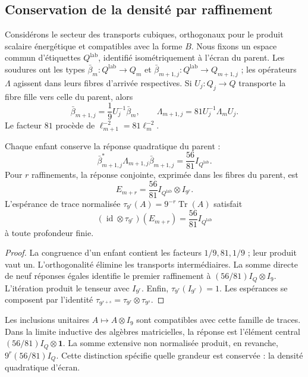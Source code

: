 \subsection{Conservation de la densité par raffinement}
\label{vii:vii:sec:densidad-refinamiento}

Considérons le secteur des transports cubiques, orthogonaux pour le produit scalaire énergétique et compatibles avec la forme \(B\). Nous fixons un espace commun d'étiquettes \(Q^{\mathrm{lab}}\), identifié isométriquement à l'écran du parent. Les soudures ont les types \(\bar\beta_m:Q^{\mathrm{lab}}\longrightarrow Q_m\) et \(\bar\beta_{m+1,j}:Q^{\mathrm{lab}}\longrightarrow Q_{m+1,j}\) ; les opérateurs \(\Lambda\) agissent dans leurs fibres d'arrivée respectives. Si \(U_j:Q_j\longrightarrow Q\) transporte la fibre fille vers celle du parent, alors
\[
 \bar\beta_{m+1,j}=\frac19U_j^{-1}\bar\beta_m,\qquad
 \Lambda_{m+1,j}=81U_j^{-1}\Lambda_mU_j.
\]
Le facteur \(81\) procède de \(\ell_{m+1}^{-2}=81\ell_m^{-2}\).

\begin{theorem}
\label{vii:vii:thm:densidad}
Chaque enfant conserve la réponse quadratique du parent :
\[
 \bar\beta_{m+1,j}^*\Lambda_{m+1,j}\bar\beta_{m+1,j}
 =\frac{56}{81}I_{Q^{\mathrm{lab}}}.
\]
Pour \(r\) raffinements, la réponse conjointe, exprimée dans les fibres
du parent, est
\[
 E_{m+r}=\frac{56}{81}I_{Q^{\mathrm{lab}}}\otimes I_{9^r}.
\]
L'espérance de trace normalisée
\(\tau_{9^r}(A)=9^{-r}\operatorname{Tr}(A)\) satisfait
\[
 (\operatorname{id}\otimes\tau_{9^r})(E_{m+r})
 =\frac{56}{81}I_{Q^{\mathrm{lab}}}
\]
à toute profondeur finie.
\end{theorem}

\begin{proof}
La congruence d'un enfant contient les facteurs \(1/9,81,1/9\) ;
leur produit vaut un. L'orthogonalité élimine les transports
intermédiaires. La somme directe de neuf réponses égales identifie
le premier raffinement à \((56/81)I_Q\otimes I_9\).
L'itération produit le tenseur avec \(I_{9^r}\).
Enfin, \(\tau_{9^r}(I_{9^r})=1\). Les espérances se composent
par l'identité
\(\tau_{9^{r+s}}=\tau_{9^r}\otimes\tau_{9^s}\).
\end{proof}

Les inclusions unitaires \(A\mapsto A\otimes I_9\) sont compatibles avec
cette famille de traces. Dans la limite inductive des algèbres matricielles,
la réponse est l'élément central
\((56/81)I_Q\otimes\mathbf1\). La somme extensive non normalisée produit,
en revanche, \(9^r(56/81)I_Q\). Cette distinction spécifie quelle grandeur
est conservée : la densité quadratique d'écran.

